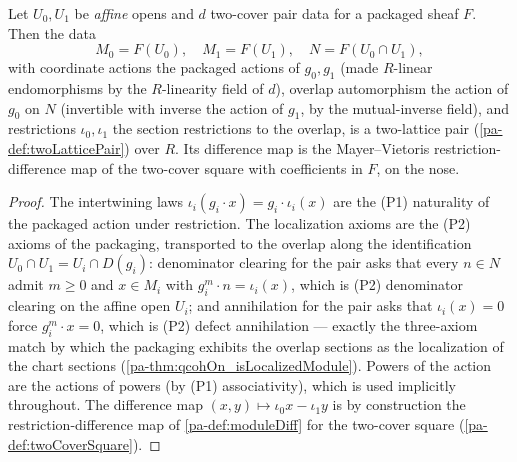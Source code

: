 \begin{definition}
  \label{pa-def:twoCoverPairData_pair}
  \leanok

  Let \(U_0, U_1\) be \emph{affine} opens and \(d\) two-cover pair data for a packaged
  sheaf \(F\). Then the data
  \[
    M_0 = F(U_0), \quad M_1 = F(U_1), \quad N = F(U_0 \cap U_1),
  \]
  with coordinate actions the packaged actions of \(g_0, g_1\) (made \(R\)-linear
  endomorphisms by the \(R\)-linearity field of \(d\)), overlap automorphism the action
  of \(g_0\) on \(N\) (invertible with inverse the action of \(g_1\), by the
  mutual-inverse field), and restrictions \(\iota_0, \iota_1\) the section restrictions
  to the overlap, is a two-lattice pair (\ref{pa-def:twoLatticePair}) over \(R\). Its
  difference map is the Mayer--Vietoris restriction-difference map of the two-cover
  square with coefficients in \(F\), on the nose.
\end{definition}
\begin{proof}
  \leanok
  The intertwining laws \(\iota_i(g_i \cdot x) = g_i \cdot \iota_i(x)\) are the
  (P1) naturality of the packaged action under restriction. The localization axioms are
  the (P2) axioms of the packaging, transported to the overlap along the identification
  \(U_0 \cap U_1 = U_i \cap D(g_i)\): denominator clearing for the pair asks that every
  \(n \in N\) admit \(m \ge 0\) and \(x \in M_i\) with \(g_i^m \cdot n =
  \iota_i(x)\), which is (P2) denominator clearing on the affine open \(U_i\); and
  annihilation for the pair asks that \(\iota_i(x) = 0\) force \(g_i^m \cdot x = 0\),
  which is (P2) defect annihilation --- exactly the three-axiom match by which the
  packaging exhibits the overlap sections as the localization of the chart sections
  (\ref{pa-thm:qcohOn_isLocalizedModule}). Powers of the action are the actions of powers
  (by (P1) associativity), which is used implicitly throughout. The difference map
  \((x, y) \mapsto \iota_0 x - \iota_1 y\) is by construction the
  restriction-difference map of \ref{pa-def:moduleDiff} for the two-cover square
  (\ref{pa-def:twoCoverSquare}).
\end{proof}

